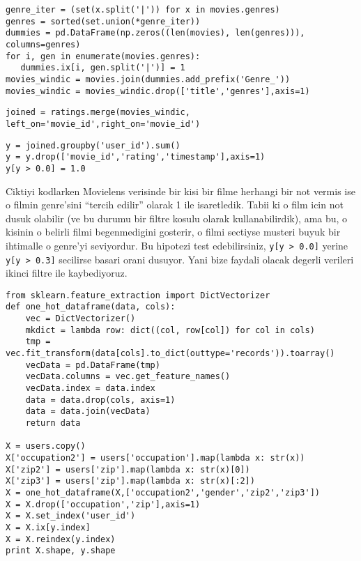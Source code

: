 \documentclass[12pt,fleqn]{article}\usepackage{../common}
\begin{document}
\begin{verbatim}
genre_iter = (set(x.split('|')) for x in movies.genres)
genres = sorted(set.union(*genre_iter))
dummies = pd.DataFrame(np.zeros((len(movies), len(genres))), columns=genres)
for i, gen in enumerate(movies.genres):
   dummies.ix[i, gen.split('|')] = 1
movies_windic = movies.join(dummies.add_prefix('Genre_'))
movies_windic = movies_windic.drop(['title','genres'],axis=1)
\end{verbatim}

\begin{verbatim}
joined = ratings.merge(movies_windic, left_on='movie_id',right_on='movie_id')
\end{verbatim}

\begin{verbatim}
y = joined.groupby('user_id').sum()
y = y.drop(['movie_id','rating','timestamp'],axis=1)
y[y > 0.0] = 1.0
\end{verbatim}

Ciktiyi kodlarken Movielens verisinde bir kisi bir filme herhangi bir not
vermis ise o filmin genre'sini ``tercih edilir'' olarak 1 ile
isaretledik. Tabii ki o film icin not dusuk olabilir (ve bu durumu bir
filtre kosulu olarak kullanabilirdik), ama bu, o kisinin o belirli filmi
begenmedigini gosterir, o filmi sectiyse musteri buyuk bir ihtimalle o
genre'yi seviyordur. Bu hipotezi test edebilirsiniz, \verb!y[y > 0.0]!
yerine \verb!y[y > 0.3]!  secilirse basari orani dusuyor. Yani bize faydali
olacak degerli verileri ikinci filtre ile kaybediyoruz.

\begin{verbatim}
from sklearn.feature_extraction import DictVectorizer
def one_hot_dataframe(data, cols):
    vec = DictVectorizer()
    mkdict = lambda row: dict((col, row[col]) for col in cols)
    tmp = vec.fit_transform(data[cols].to_dict(outtype='records')).toarray()
    vecData = pd.DataFrame(tmp)
    vecData.columns = vec.get_feature_names()
    vecData.index = data.index
    data = data.drop(cols, axis=1)
    data = data.join(vecData)
    return data

X = users.copy()
X['occupation2'] = users['occupation'].map(lambda x: str(x))
X['zip2'] = users['zip'].map(lambda x: str(x)[0])
X['zip3'] = users['zip'].map(lambda x: str(x)[:2])
X = one_hot_dataframe(X,['occupation2','gender','zip2','zip3'])
X = X.drop(['occupation','zip'],axis=1)
X = X.set_index('user_id')
X = X.ix[y.index]
X = X.reindex(y.index)
print X.shape, y.shape
\end{verbatim}
\end{document}
